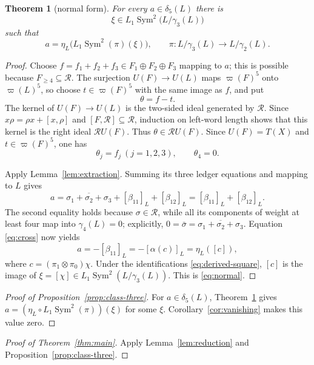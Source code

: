 \documentclass[11pt]{amsart}
\newtheorem{theorem}{Theorem}[section]
\newcommand{\Sym}{\operatorname{Sym}}
\newcommand{\gm}{\gamma}
\newcommand{\dlt}{\delta}
\newcommand{\aug}{\varpi}
\newcommand{\Rel}{\mathcal R}
\begin{document}
\begin{theorem}[normal form]\label{thm:normal}
For every $a\in\dlt_5(L)$ there is
\[
 \xi\in L_1\Sym^2\bigl(L/\gm_3(L)\bigr)
\]
such that
\begin{equation}\label{eq:normal}
 a=\eta_L\bigl(L_1\Sym^2(\pi)(\xi)\bigr),
 \qquad \pi:L/\gm_3(L)\longrightarrow L/\gm_2(L).
\end{equation}
\end{theorem}

\begin{proof}
Choose
$f=f_1+f_2+f_3\in F_1\oplus F_2\oplus F_3$ mapping to $a$; this is
possible because $F_{\geq4}\subseteq\Rel$.  The surjection
$U(F)\to U(L)$ maps $\aug(F)^5$ onto $\aug(L)^5$, so choose
$t\in\aug(F)^5$ with the same image as $f$, and put
\[
                              \theta=f-t.
\]
The kernel of $U(F)\to U(L)$ is the two-sided ideal generated by
$\Rel$.  Since $x\rho=\rho x+[x,\rho]$ and
$[F,\Rel]\subseteq\Rel$, induction on left-word length shows that
this kernel is the right ideal $\Rel U(F)$.
Thus $\theta\in\Rel U(F)$.  Since $U(F)=T(X)$ and
$t\in\aug(F)^5$, one has
\[
                 \theta_j=f_j\ (j=1,2,3),\qquad \theta_4=0.
\]

Apply Lemma~\ref{lem:extraction}.  Summing its three ledger equations
and mapping to $L$ gives
\begin{equation}\label{eq:witness-evaluation}
 a=\overline{\sigma_1+\sigma_2+\sigma_3}
      +[\beta_{11}]_L+[\beta_{12}]_L
   =[\beta_{11}]_L+[\beta_{12}]_L.
\end{equation}
The second equality holds because $\sigma\in\Rel$, while all its
components of weight at least four map into $\gm_4(L)=0$; explicitly,
$0=\bar\sigma=\overline{\sigma_1+\sigma_2+\sigma_3}$.
Equation \eqref{eq:cross} now yields
\[
                 a=-[\beta_{11}]_L
                   =-[\alpha(c)]_L=\eta_L([c]),
\]
where $c=(\pi_1\otimes\pi_0)\chi$.  Under the identifications
\eqref{eq:derived-square}, $[c]$ is the image of
$\xi=[\chi]\in L_1\Sym^2(L/\gm_3(L))$.  This is \eqref{eq:normal}.
\end{proof}

\begin{proof}[Proof of Proposition~\ref{prop:class-three}]
For $a\in\dlt_5(L)$, Theorem~\ref{thm:normal} gives
$a=(\eta_L\circ L_1\Sym^2(\pi))(\xi)$ for some $\xi$.
Corollary~\ref{cor:vanishing} makes this value zero.
\end{proof}

\begin{proof}[Proof of Theorem~\ref{thm:main}]
Apply Lemma~\ref{lem:reduction} and
Proposition~\ref{prop:class-three}.
\end{proof}
\end{document}
